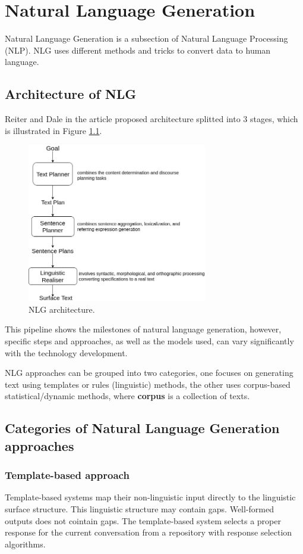\chapter{Natural Language Generation}\label{nlg}
Natural Language Generation is a subsection of Natural Language Processing (NLP). NLG uses different methods and tricks to convert data to human language.

\section{Architecture of NLG}
  Reiter and Dale in the article \cite{applied_nlg} proposed architecture splitted into 3 stages, which is illustrated in Figure \ref{nlg architecture}. 
\begin{figure}[hbt]
  \centering
  \includegraphics[width=0.7\textwidth]{figures/nlg_architecture.jpg}
  \caption{NLG architecture.}
  \label{nlg architecture}
\end{figure}

This pipeline shows the milestones of natural language generation, however, specific steps and approaches, as well as the models used, can vary significantly with the technology development.

NLG approaches can be grouped into two categories, one focuses on generating text using templates or rules (linguistic) methods, the other uses corpus-based statistical/dynamic methods, where \textbf{corpus} is a collection of texts.

\section{Categories of Natural Language Generation approaches}

\subsection{Template-based approach} 
Template-based systems map their non-linguistic input directly to the linguistic surface structure. This linguistic structure may contain gaps. Well-formed outputs does not cointain gaps.
The template-based system selects a proper response for the current conversation from a repository with response selection algorithms. 

